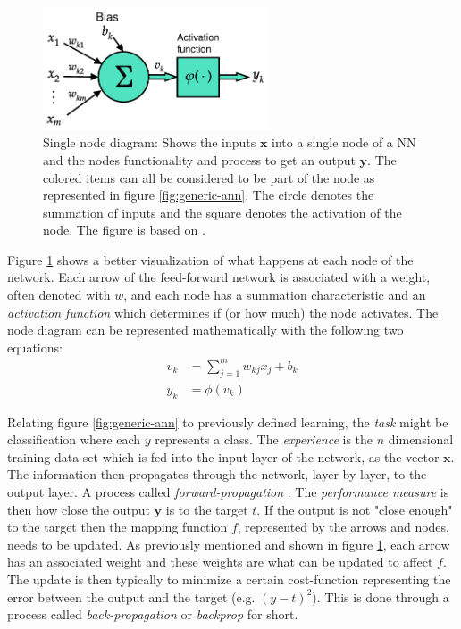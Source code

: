 \documentclass[../main.tex]{subfiles}
\begin{document}
\begin{figure}[ht!]
    \centering
    \includegraphics[width=0.6\textwidth]{img/node-diagram}
    \caption{Single node diagram: Shows the inputs $\mathbf{x}$ into a single node of a \ac{NN} and the nodes functionality and process to get an output $\mathbf{y}$. The colored items can all be considered to be part of the node as represented in figure \ref{fig:generic-ann}. The circle denotes the summation of inputs and the square denotes the activation of the node. The figure is based on \cite[Fig. 5]{Haykin2009}.}
    \label{fig:node-diagram}
\end{figure}

Figure \ref{fig:node-diagram} shows a better visualization of what happens at each node of the network.
Each arrow of the feed-forward network is associated with a weight, often denoted with $w$, and each node has a summation characteristic and an \textit{activation function} which determines if (or how much) the node activates.
The node diagram can be represented mathematically with the following two equations:
\begin{align}
    v_k &= \sum_{j=1}^m w_{kj}x_j + b_k \\
    y_k &= \phi (v_k)
\end{align}

Relating figure \ref{fig:generic-ann} to previously defined learning, the \textit{task} might be classification where each $y$ represents a class.
The \textit{experience} is the $n$ dimensional training data set which is fed into the input layer of the network, as the vector $\mathbf{x}$.
The information then propagates through the network, layer by layer, to the output layer. A process called \textit{forward-propagation} \cite{Goodfellow2016}.
The \textit{performance measure} is then how close the output $\mathbf{y}$ is to the target $t$.
If the output is not "close enough" to the target then the mapping function $f$, represented by the arrows and nodes, needs to be updated.
As previously mentioned and shown in figure \ref{fig:node-diagram}, each arrow has an associated weight and these weights are what can be updated to affect $f$.
The update is then typically to minimize a certain cost-function representing the error between the output and the target (e.g. $(y-t)^2$).
This is done through a process called \textit{back-propagation} or \textit{backprop} for short.
\end{document}

